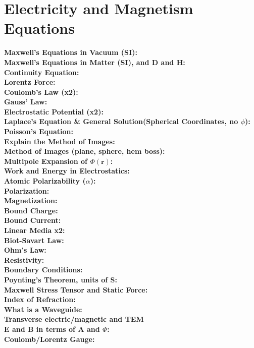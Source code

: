 \documentclass[12pt]{extarticle}
\newcommand{\E}{\mathbf{E}}
\newcommand{\B}{\mathbf{B}}
\newcommand{\D}{\mathbf{D}}
\renewcommand{\H}{\mathbf{H}}
\newcommand{\A}{\mathbf{A}}
\begin{document}
\section{Electricity and Magnetism Equations}
\textbf{Maxwell's Equations in Vacuum (SI):} \\
\textbf{Maxwell's Equations in Matter (SI), and $\D$ and $\H$:} \\
\textbf{Continuity Equation:} \\
\textbf{Lorentz Force:} \\
\textbf{Coulomb's Law (x2):} \\
\textbf{Gauss' Law:} \\
\textbf{Electrostatic Potential (x2):} \\
\textbf{Laplace's Equation \& General Solution(Spherical Coordinates, no $\phi$):} \\
\textbf{Poisson's Equation:} \\
\textbf{Explain the Method of Images:} \\
\textbf{Method of Images (plane, sphere, hem boss):} \\
\textbf{Multipole Expansion of $\Phi(\mathbf{r})$:} \\
\textbf{Work and Energy in Electrostatics:} \\
\textbf{Atomic Polarizability ($\alpha$):} \\
\textbf{Polarization:} \\
\textbf{Magnetization:} \\
\textbf{Bound Charge:} \\
\textbf{Bound Current:} \\
\textbf{Linear Media x2:} \\
\textbf{Biot-Savart Law:} \\
\textbf{Ohm's Law:} \\
\textbf{Resistivity:} \\
\textbf{Boundary Conditions:} \\
\textbf{Poynting's Theorem, units of $\mathbf{S}$:} \\
\textbf{Maxwell Stress Tensor and Static Force:} \\
\textbf{Index of Refraction:} \\
\textbf{What is a Waveguide:} \\
\textbf{Transverse electric/magnetic and TEM} \\
\textbf{$\E$ and $\B$ in terms of $\A$ and $\Phi$:} \\
\textbf{Coulomb/Lorentz Gauge:} \\
\end{document}
